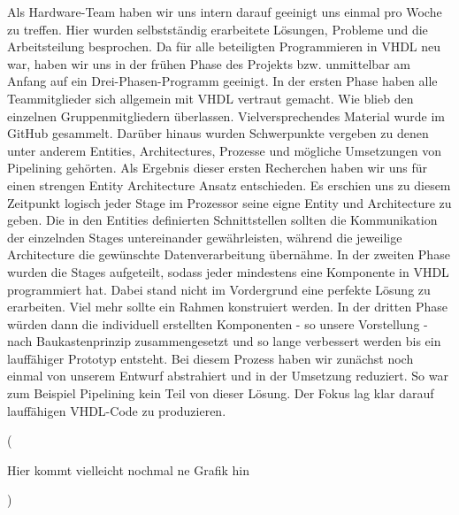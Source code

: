 \documentclass[paper=a4,fontsize=12pt]{scrreprt}
\begin{document}
Als Hardware-Team haben wir uns intern darauf geeinigt uns einmal pro Woche zu treffen. Hier wurden selbstständig erarbeitete Lösungen, Probleme und die Arbeitsteilung besprochen. Da für alle beteiligten Programmieren in VHDL neu war, haben wir uns in der frühen Phase des Projekts bzw. unmittelbar am Anfang auf ein Drei-Phasen-Programm geeinigt.
In der ersten Phase haben alle Teammitglieder sich allgemein mit VHDL vertraut gemacht. Wie blieb den einzelnen Gruppenmitgliedern überlassen. Vielversprechendes Material wurde im GitHub gesammelt. Darüber hinaus wurden Schwerpunkte vergeben zu denen unter anderem Entities, Architectures, Prozesse und mögliche Umsetzungen von Pipelining gehörten. Als Ergebnis dieser ersten Recherchen haben wir uns für einen strengen Entity Architecture Ansatz entschieden.
Es erschien uns zu diesem Zeitpunkt logisch jeder Stage im Prozessor seine eigne Entity und Architecture zu geben. Die in den Entities definierten Schnittstellen sollten die Kommunikation der einzelnden Stages untereinander gewährleisten, während die jeweilige Architecture die gewünschte Datenverarbeitung übernähme.
In der zweiten Phase wurden die Stages aufgeteilt, sodass jeder mindestens eine Komponente in VHDL programmiert hat. Dabei stand nicht im Vordergrund eine perfekte Lösung zu erarbeiten. Viel mehr sollte ein Rahmen konstruiert werden. In der dritten Phase würden dann die individuell erstellten Komponenten - so unsere Vorstellung - nach Baukastenprinzip zusammengesetzt und so lange verbessert werden bis ein lauffähiger Prototyp entsteht.
Bei diesem Prozess haben wir zunächst noch einmal von unserem Entwurf abstrahiert und in der Umsetzung reduziert. So war zum Beispiel Pipelining kein Teil von dieser Lösung. Der Fokus lag klar darauf lauffähigen VHDL-Code zu produzieren.


(

Hier kommt vielleicht nochmal ne Grafik hin

)
\end{document}
